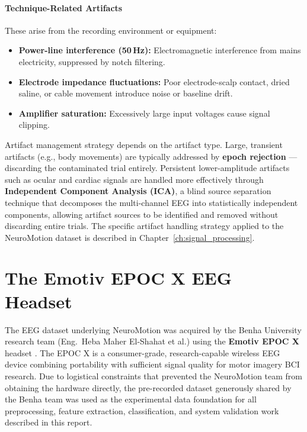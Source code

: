 \documentclass[12pt, a4paper, oneside]{report}
\begin{document}
\paragraph{Technique-Related Artifacts}
These arise from the recording environment or equipment:

\begin{itemize}
  \item \textbf{Power-line interference (50\,Hz):} Electromagnetic interference
        from mains electricity, suppressed by notch filtering.
  \item \textbf{Electrode impedance fluctuations:} Poor electrode-scalp contact,
        dried saline, or cable movement introduce noise or baseline drift.
  \item \textbf{Amplifier saturation:} Excessively large input voltages cause
        signal clipping.
\end{itemize}

Artifact management strategy depends on the artifact type. Large, transient
artifacts (e.g., body movements) are typically addressed by
\textbf{epoch rejection} --- discarding the contaminated trial entirely.
Persistent lower-amplitude artifacts such as ocular and cardiac signals are
handled more effectively through \textbf{Independent Component Analysis (ICA)},
a blind source separation technique that decomposes the multi-channel EEG into
statistically independent components, allowing artifact sources to be identified
and removed without discarding entire trials. The specific artifact handling
strategy applied to the NeuroMotion dataset is described in
Chapter~\ref{ch:signal_processing}.

\section{The Emotiv EPOC X EEG Headset}
\label{sec:epocx}

The EEG dataset underlying NeuroMotion was acquired by the Benha University
research team (Eng.\ Heba Maher El-Shahat et al.) using the
\textbf{Emotiv EPOC X} headset \cite{emotiv2024}. The EPOC X is a consumer-grade,
research-capable wireless EEG device combining portability with sufficient signal
quality for motor imagery BCI research. Due to logistical constraints that
prevented the NeuroMotion team from obtaining the hardware directly, the
pre-recorded dataset generously shared by the Benha team was used as the
experimental data foundation for all preprocessing, feature extraction,
classification, and system validation work described in this report.
\end{document}
